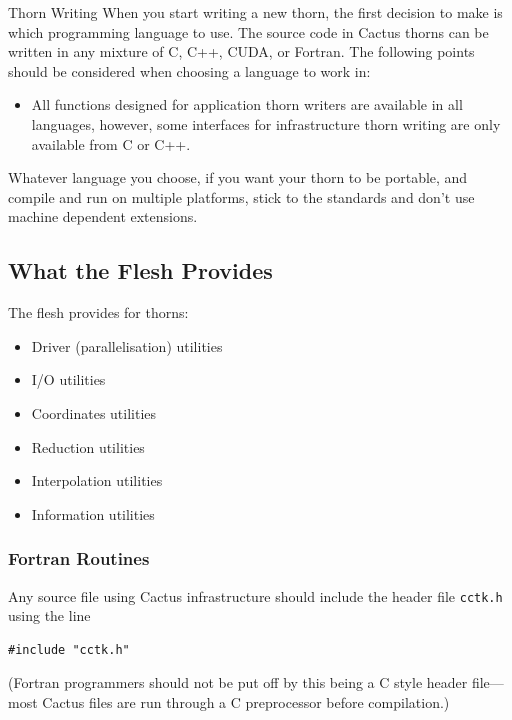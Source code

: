 \begin{cactuspart}{Thorn Writing}
When you start writing a new thorn, the first decision to make is
which programming language to use. The source code in Cactus thorns
can be written in any mixture of C, C++, CUDA, or Fortran.
The following points should be considered when
choosing a language to work in:
\begin{itemize}

\item All functions designed for application thorn writers are available
      in all languages, however, some interfaces for infrastructure
      thorn writing are only available from C or C++.

\end{itemize}

Whatever language you choose, if you want your thorn to be portable, and
compile and run on multiple platforms, stick to the standards and don't
use machine dependent extensions.


\subsection{What the Flesh Provides}

The flesh provides for thorns:
\begin{Lentry}
\item [\texttt{Variables}]
\item [\texttt{Parameters}]
\item [\texttt{Cactus Functions}]

\begin{itemize}
  \item{} Driver (parallelisation) utilities
  \item{} I/O utilities
  \item{} Coordinates utilities
  \item{} Reduction utilities
  \item{} Interpolation utilities
  \item{} Information utilities
\end{itemize}
\end{Lentry}


\subsubsection{Fortran Routines}

Any source file using Cactus infrastructure should include
the header file \texttt{cctk.h} using the line
\begin{verbatim}
#include "cctk.h"
\end{verbatim}
(Fortran programmers should not be put off by this being a C style
header file---most Cactus files are run through a C preprocessor
before compilation.)


\end{cactuspart}
